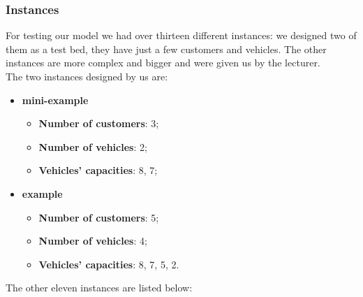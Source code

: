 \documentclass[../main.tex]{subfiles}
\begin{document}
\subsubsection{Instances}
For testing our model we had over thirteen different instances: we designed two of them as a test bed, they have just a few customers and vehicles.
The other instances are more complex and bigger and were given us by the lecturer.\\
The two instances designed by us are:
\begin{itemize}
    \item \textbf{mini-example}
        \begin{itemize}
            \item \textbf{Number of customers}: 3;
            \item \textbf{Number of vehicles}: 2;
            \item \textbf{Vehicles' capacities}: 8, 7;
        \end{itemize}

    \item \textbf{example}
        \begin{itemize}
            \item \textbf{Number of customers}: 5;
            \item \textbf{Number of vehicles}: 4;
            \item \textbf{Vehicles' capacities}: 8, 7, 5, 2.
        \end{itemize}
\end{itemize}
The other eleven instances are listed below:
\end{document}
